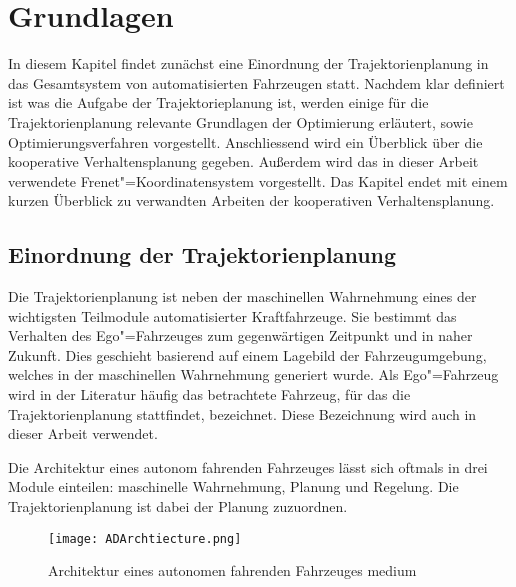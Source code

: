 
\chapter{Grundlagen}
\label{sec:fundamentals_related-work}

In diesem Kapitel findet zun\"achst eine Einordnung der Trajektorienplanung in das Gesamtsystem von automatisierten Fahrzeugen statt.
Nachdem klar definiert ist was die Aufgabe der Trajektorieplanung ist, werden einige f\"ur die Trajektorienplanung relevante Grundlagen der Optimierung  erl\"autert, sowie Optimierungsverfahren vorgestellt.
Anschlie{ss}end wird ein \"Uberblick \"uber die kooperative Verhaltensplanung gegeben.
Au{\ss}erdem wird das in dieser Arbeit verwendete Frenet"=Koordinatensystem vorgestellt.
Das Kapitel endet mit einem kurzen \"Uberblick zu verwandten Arbeiten der kooperativen Verhaltensplanung.

\section{Einordnung der Trajektorienplanung}
\label{Einordung_Trajktorieplanung}
Die Trajektorienplanung ist neben der maschinellen Wahrnehmung eines der wichtigsten Teilmodule automatisierter Kraftfahrzeuge.
Sie bestimmt das Verhalten des Ego"=Fahrzeuges zum gegenw\"artigen Zeitpunkt und in naher Zukunft.
Dies geschieht basierend auf einem Lagebild der Fahrzeugumgebung, welches in der maschinellen Wahrnehmung generiert wurde. \cite{Ziegler2017}
Als Ego"=Fahrzeug wird in der Literatur h\"aufig das betrachtete Fahrzeug, f\"ur das die Trajektorienplanung stattfindet, bezeichnet.
Diese Bezeichnung wird auch in dieser Arbeit verwendet.

Die Architektur eines autonom fahrenden Fahrzeuges l\"asst sich oftmals in drei Module einteilen: maschinelle Wahrnehmung, Planung und Regelung.  
Die Trajektorienplanung ist dabei der Planung zuzuordnen.  

\begin{figure}[!htbp]
    \centering
    \texttt{[image: ADArchtiecture.png]}
    \caption[Architektur autonomer Fahrzeuge]{Architektur eines autonomen fahrenden Fahrzeuges \gls{medium}}
    \label{fig:ADArchtiecture}
\end{figure}

